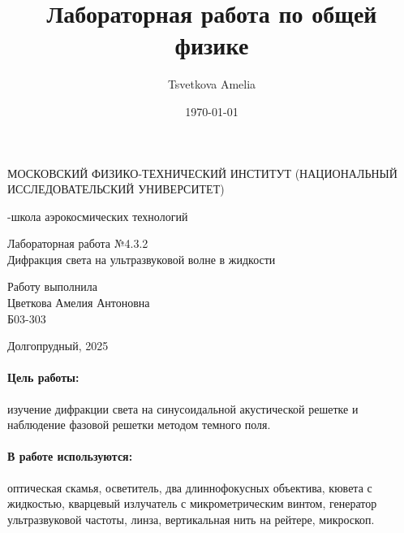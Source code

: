 \documentclass[a4paper,12pt]{article}
\author{Tsvetkova Amelia}
\title{Лабораторная работа по общей физике}
\date{\today}
\begin{document}
\begin{titlepage}
    \newpage
    \begin{center}
    {\large МОСКОВСКИЙ ФИЗИКО-ТЕХНИЧЕСКИЙ ИНСТИТУТ (НАЦИОНАЛЬНЫЙ ИССЛЕДОВАТЕЛЬСКИЙ УНИВЕРСИТЕТ)}
    \vspace{1cm}

    {-школа аэрокосмических технологий}
    \vspace{6em}
    \end{center}
    
    \vspace{1.2em}

    \begin{center}
    \Large Лабораторная работа №4.3.2 \\
    Дифракция света на ультразвуковой волне в жидкости
    \linebreak
    \end{center}
    
    \vspace{11em}
    
    \begin{flushright}
                       {\large Работу выполнила\\
                       Цветкова Амелия Антоновна\\
                       Б03-303 }
    \end{flushright}

    \vspace{\fill}

    \begin{center}
    Долгопрудный, 2025
    \end{center}

    \end{titlepage}

\paragraph{Цель работы:} изучение дифракции света на синусоидальной акустической решетке и наблюдение фазовой решетки методом темного поля.

\paragraph{В работе используются:} оптическая скамья, осветитель, два длиннофокусных объектива, кювета с жидкостью, кварцевый излучатель с микрометрическим винтом, генератор ультразвуковой частоты, линза, вертикальная нить на рейтере, микроскоп.
\end{document}
